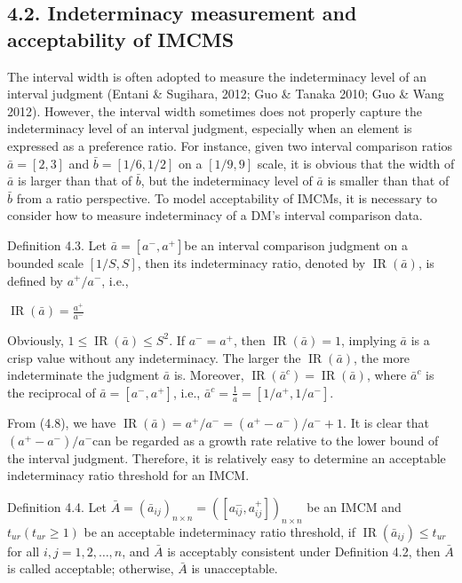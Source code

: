 \documentclass[10pt]{article}
\begin{document}
\subsection*{4.2. Indeterminacy measurement and acceptability of IMCMS}
The interval width is often adopted to measure the indeterminacy level of an interval judgment (Entani \& Sugihara, 2012; Guo \& Tanaka 2010; Guo \& Wang 2012). However, the interval width sometimes does not properly capture the indeterminacy level of an interval judgment, especially when an element is expressed as a preference ratio. For instance, given two interval comparison ratios $\bar{a}=[2,3]$ and $\bar{b}=[1 / 6,1 / 2]$ on a $[1 / 9,9]$ scale, it is obvious that the width of $\bar{a}$ is larger than that of $\bar{b}$, but the indeterminacy level of $\bar{a}$ is smaller than that of $\bar{b}$ from a ratio perspective. To model acceptability of IMCMs, it is necessary to consider how to measure indeterminacy of a DM's interval comparison data.

Definition 4.3. Let $\bar{a}=\left[a^{-}, a^{+}\right]$be an interval comparison judgment on a bounded scale $[1 / S, S]$, then its indeterminacy ratio, denoted by $\operatorname{IR}(\bar{a})$, is defined by $a^{+} / a^{-}$, i.e.,

$\operatorname{IR}(\bar{a})=\frac{a^{+}}{a^{-}}$

Obviously, $1 \leq \operatorname{IR}(\bar{a}) \leq S^{2}$. If $a^{-}=a^{+}$, then $\operatorname{IR}(\bar{a})=1$, implying $\bar{a}$ is a crisp value without any indeterminacy. The larger the $\operatorname{IR}(\bar{a})$, the more indeterminate the judgment $\bar{a}$ is. Moreover, $\operatorname{IR}\left(\bar{a}^{c}\right)=\operatorname{IR}(\bar{a})$, where $\bar{a}^{c}$ is the reciprocal of $\bar{a}=\left[a^{-}, a^{+}\right]$, i.e., $\bar{a}^{c}=\frac{1}{\bar{a}}=\left[1 / a^{+}, 1 / a^{-}\right]$.

From (4.8), we have $\operatorname{IR}(\bar{a})=a^{+} / a^{-}=\left(a^{+}-a^{-}\right) / a^{-}+1$. It is clear that $\left(a^{+}-a^{-}\right) / a^{-}$can be regarded as a growth rate relative to the lower bound of the interval judgment. Therefore, it is relatively easy to determine an acceptable indeterminacy ratio threshold for an IMCM.

Definition 4.4. Let $\bar{A}=\left(\bar{a}_{i j}\right)_{n \times n}=\left(\left[a_{i j}^{-}, a_{i j}^{+}\right]\right)_{n \times n}$ be an IMCM and $t_{u r}\left(t_{u r} \geq 1\right)$ be an acceptable indeterminacy ratio threshold, if $\operatorname{IR}\left(\bar{a}_{i j}\right) \leq t_{u r}$ for all $i, j=1,2, \ldots, n$, and $\bar{A}$ is acceptably consistent under Definition 4.2, then $\bar{A}$ is called acceptable; otherwise, $\bar{A}$ is unacceptable.
\end{document}
